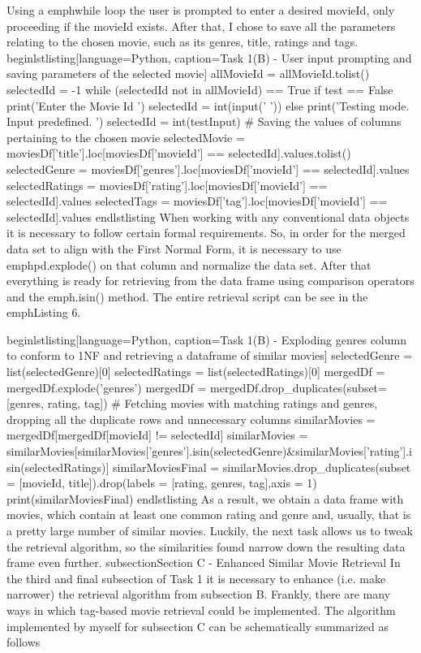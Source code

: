 Using a emph{while} loop the user is prompted to enter a desired movieId,  only proceeding if the movieId
exists. After that, I chose to save all the parameters relating to the chosen movie, such as its genres, title, ratings and tags.
begin{lstlisting}[language=Python, caption=Task 1(B) - User input prompting and saving parameters of the selected movie]
        allMovieId = allMovieId.tolist()
        selectedId = -1
        while (selectedId not in allMovieId) == True
                if test == False
                        print('Enter the Movie Id ')
                        selectedId = int(input(' '))
                else
                        print('Testing mode. Input predefined. ')
                        selectedId = int(testInput)
        # Saving the values of columns pertaining to the chosen movie
        selectedMovie = moviesDf['title'].loc[moviesDf['movieId'] == selectedId].values.tolist()
        selectedGenre = moviesDf['genres'].loc[moviesDf['movieId'] == selectedId].values
        selectedRatings = moviesDf['rating'].loc[moviesDf['movieId'] == selectedId].values
        selectedTags = moviesDf['tag'].loc[moviesDf['movieId'] == selectedId].values
end{lstlisting}
When working with any conventional data objects it is necessary to follow certain formal requirements.
So, in order for the merged data set to align with the First Normal Form, it is necessary  to use emph{pd.explode()} on that column and normalize the data set.
After that everything is ready for retrieving from the data frame using comparison operators and the emph{.isin()} method. The entire retrieval script can be see in the emph{Listing 6}.

begin{lstlisting}[language=Python, caption=Task 1(B) - Exploding genres column to conform to 1NF and retrieving a dataframe of similar movies]
selectedGenre = list(selectedGenre)[0]
        selectedRatings = list(selectedRatings)[0]
        mergedDf = mergedDf.explode('genres')
        mergedDf = mergedDf.drop_duplicates(subset=[genres, rating, tag])
        # Fetching movies with matching ratings and genres, dropping all the duplicate rows and  unnecessary columns
        similarMovies = mergedDf[mergedDf[movieId] != selectedId]
        similarMovies = similarMovies[similarMovies['genres'].isin(selectedGenre)&similarMovies['rating'].isin(selectedRatings)]
        similarMoviesFinal = similarMovies.drop_duplicates(subset = [movieId, title]).drop(labels = [rating, genres, tag],axis = 1)
        print(similarMoviesFinal)
end{lstlisting}
As a result, we obtain a data frame with movies, which contain at least  one common rating and genre and, 
usually, that is a pretty large number of similar movies. Luckily, the next task allows us to tweak the
retrieval algorithm, so the similarities found narrow down the resulting data frame even further.
subsection{Section C - Enhanced Similar Movie Retrieval}
In the third and final subsection of  Task 1 it is necessary to enhance (i.e. make narrower) the retrieval algorithm from subsection B. Frankly, there are many ways in which tag-based movie retrieval  could be implemented.
The algorithm implemented by myself for subsection C can be schematically summarized as follows

